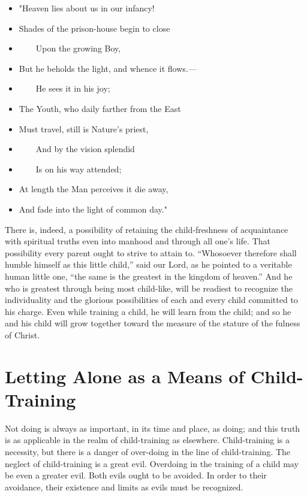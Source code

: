 \documentclass[
]{book}
\providecommand{\tightlist}{%
  \setlength{\itemsep}{0pt}\setlength{\parskip}{0pt}}
\begin{document}
\begin{itemize}
\tightlist
\item
  "Heaven lies about us in our infancy!
\item
  Shades of the prison-house begin to close
\item
  ~~~~Upon the growing Boy,
\item
  But he beholds the light, and whence it flows.---
\item
  ~~~~He sees it in his joy;
\item
  The Youth, who daily farther from the East
\item
  Must travel, still is Nature's priest,
\item
  ~~~~And by the vision splendid
\item
  ~~~~Is on his way attended;
\item
  At length the Man perceives it die away,
\item
  And fade into the light of common day."
\end{itemize}

There is, indeed, a possibility of retaining the child-freshness of acquaintance with spiritual truths even into manhood and through all one's life. That possibility every parent ought to strive to attain to. ``Whosoever therefore shall humble himself as this little child,'' said our Lord, as he pointed to a veritable human little one, ``the same is the greatest in the kingdom of heaven.'' And he who is greatest through being most child-like, will be readiest to recognize the individuality and the glorious possibilities of each and every child committed to his charge. Even while training a child, he will learn from the child; and so he and his child will grow together toward the measure of the stature of the fulness of Christ.

\hypertarget{letting-alone-as-a-means-of-child-training}{%
\chapter{Letting Alone as a Means of Child-Training}\label{letting-alone-as-a-means-of-child-training}}

Not doing is always as important, in its time and place, as doing; and this truth is as applicable in the realm of child-training as elsewhere. Child-training is a necessity, but there is a danger of over-doing in the line of child-training. The neglect of child-training is a great evil. Overdoing in the training of a child may be even a greater evil. Both evils ought to be avoided. In order to their avoidance, their existence and limits as evils must be recognized.
\end{document}
